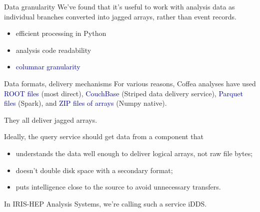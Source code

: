 \documentclass[aspectratio=169]{beamer}
\begin{document}
\begin{frame}{Data granularity}
\large
\vspace{0.5 cm}
We've found that it's useful to work with analysis data as individual branches converted into jagged arrays, rather than event records.
\begin{itemize}
\item efficient processing in Python
\item analysis code readability
\item \textcolor{darkblue}{columnar granularity}
\end{itemize}

\vspace{0.5 cm}

\vspace{0.5 cm}

\vspace{0.5 cm}
\end{frame}

\begin{frame}{Data formats, delivery mechanisms}
\large
\vspace{0.5 cm}
For various reasons, Coffea analyses have used \textcolor{darkblue}{ROOT files} (most direct), \textcolor{darkblue}{CouchBase} (Striped data delivery service), \textcolor{darkblue}{Parquet files} (Spark), and \textcolor{darkblue}{ZIP files of arrays} (Numpy native).

\vspace{0.5 cm}
They all deliver jagged arrays.

\vspace{0.5 cm}
Ideally, the query service should get data from a component that

\vspace{0.25 cm}
\begin{itemize}
\item understands the data well enough to deliver logical arrays, not raw file bytes;
\item doesn't double disk space with a secondary format;
\item puts intelligence close to the source to avoid unnecessary transfers.
\end{itemize}

\vspace{0.25 cm}
In IRIS-HEP Analysis Systems, we're calling such a service iDDS.
\end{frame}
\end{document}
